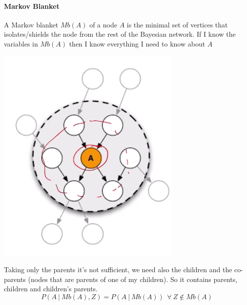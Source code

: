 \documentclass[10pt]{report}
\begin{document}
\paragraph{Markov Blanket} A Markov blanket $Mb(A)$ of a node $A$ is the minimal set of vertices that isolates/shields the node from the rest of the Bayesian network. If I know the variables in $Mb(A)$ then I know everything I need to know about $A$\begin{center}
	\includegraphics[scale=0.33]{19.png}
\end{center}
Taking only the parents it's not sufficient, we need also the children and the co-parents (nodes that are parents of one of my children). So it contains parents, children and children's parents.
$$P(A\:|\:Mb(A), Z) = P(A\:|\:Mb(A))\:\:\forall\:Z\not\in Mb(A)$$
\pagebreak
\end{document}
